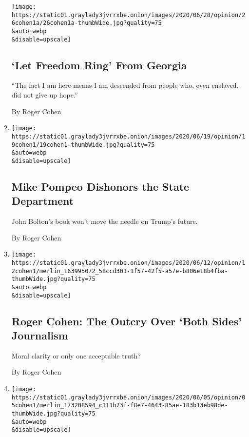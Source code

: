 \begin{enumerate}
  \texttt{[image: https://static01.graylady3jvrrxbe.onion/images/2020/06/28/opinion/26cohen1a/26cohen1a-thumbWide.jpg?quality=75\\\&auto=webp\\\&disable=upscale]}

  \hypertarget{let-freedom-ring-from-georgia}{%
  \subsection{`Let Freedom Ring' From
  Georgia}\label{let-freedom-ring-from-georgia}}

  ``The fact I am here means I am descended from people who, even
  enslaved, did not give up hope.''

  By Roger Cohen
\item
  \href{/2020/06/19/opinion/mike-pompeo-state-department.html}{}

  \texttt{[image: https://static01.graylady3jvrrxbe.onion/images/2020/06/19/opinion/19cohen1/19cohen1-thumbWide.jpg?quality=75\\\&auto=webp\\\&disable=upscale]}

  \hypertarget{mike-pompeo-dishonors-the-state-department}{%
  \subsection{Mike Pompeo Dishonors the State
  Department}\label{mike-pompeo-dishonors-the-state-department}}

  John Bolton's book won't move the needle on Trump's future.

  By Roger Cohen
\item
  \href{/2020/06/12/opinion/journalism-debate.html}{}

  \texttt{[image: https://static01.graylady3jvrrxbe.onion/images/2020/06/12/opinion/12cohen1/merlin\_163995072\_58ccd301-1f57-42f5-a57e-b806e18b4fba-thumbWide.jpg?quality=75\\\&auto=webp\\\&disable=upscale]}

  \hypertarget{roger-cohen-the-outcry-over-both-sides-journalism}{%
  \subsection{Roger Cohen: The Outcry Over `Both Sides'
  Journalism}\label{roger-cohen-the-outcry-over-both-sides-journalism}}

  Moral clarity or only one acceptable truth?

  By Roger Cohen
\item
  \href{/2020/06/05/opinion/george-floyd-protests.html}{}

  \texttt{[image: https://static01.graylady3jvrrxbe.onion/images/2020/06/05/opinion/05cohen1/merlin\_173208594\_c111b73f-f8e7-4643-85ae-183b13eb98de-thumbWide.jpg?quality=75\\\&auto=webp\\\&disable=upscale]}


\end{enumerate}
